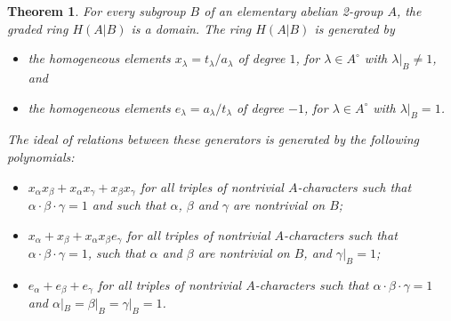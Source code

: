 \documentclass{amsart}[12pt]
\numberwithin{equation}{section}
\newtheorem{theorem}[equation]{Theorem}
\theoremstyle{definition}
\begin{document}
\begin{theorem}\label{thm:localization}
  For every subgroup $B$ of an elementary abelian 2-group $A$,
  the graded ring $H(A|B)$ is a domain.
  The ring $H(A|B)$ is generated by
  \begin{itemize}
  \item 
    the homogeneous elements $x_\lambda=t_\lambda/a_\lambda$ of degree $1$,
    for $\lambda\in A^\circ$ with $\lambda|_B\ne 1$, and
  \item the homogeneous elements $e_\lambda=a_\lambda/t_\lambda$
    of degree $-1$, for $\lambda\in A^\circ$ with $\lambda|_B= 1$.
\end{itemize}
The ideal of relations between these generators is generated by
    the following polynomials:
    \begin{itemize}
    \item $x_\alpha x_\beta + x_\alpha x_\gamma + x_\beta x_\gamma$ for all triples
      of nontrivial $A$-characters such that $\alpha\cdot\beta\cdot\gamma=1$
      and such that $\alpha$, $\beta$ and $\gamma$ are nontrivial on $B$;      
    \item $x_\alpha+ x_\beta + x_\alpha x_\beta e_\gamma$ for all triples
      of nontrivial $A$-characters such that $\alpha\cdot\beta\cdot\gamma=1$,
      such that $\alpha$ and $\beta$ are nontrivial on $B$, and $\gamma|_B=1$;
    \item $e_\alpha+ e_\beta + e_\gamma$ for all triples
      of nontrivial $A$-characters such that $\alpha\cdot\beta\cdot\gamma=1$
      and $\alpha|_B=\beta|_B=\gamma|_B=1$.
    \end{itemize}
  \end{theorem}
\end{document}
